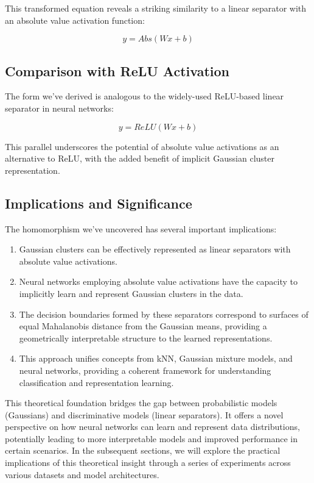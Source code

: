 \documentclass[11pt]{article}
\begin{document}
This transformed equation reveals a striking similarity to a linear separator with an absolute value activation function:

\begin{equation}
y = Abs(Wx + b)
\end{equation}

\subsection{Comparison with ReLU Activation}

The form we've derived is analogous to the widely-used ReLU-based linear separator in neural networks:

\begin{equation}
y = ReLU(Wx + b)
\end{equation}

This parallel underscores the potential of absolute value activations as an alternative to ReLU, with the added benefit of implicit Gaussian cluster representation.

\subsection{Implications and Significance}

The homomorphism we've uncovered has several important implications:

\begin{enumerate}
\item Gaussian clusters can be effectively represented as linear separators with absolute value activations.
\item Neural networks employing absolute value activations have the capacity to implicitly learn and represent Gaussian clusters in the data.
\item The decision boundaries formed by these separators correspond to surfaces of equal Mahalanobis distance from the Gaussian means, providing a geometrically interpretable structure to the learned representations.
\item This approach unifies concepts from kNN, Gaussian mixture models, and neural networks, providing a coherent framework for understanding classification and representation learning.
\end{enumerate}

This theoretical foundation bridges the gap between probabilistic models (Gaussians) and discriminative models (linear separators). It offers a novel perspective on how neural networks can learn and represent data distributions, potentially leading to more interpretable models and improved performance in certain scenarios.
In the subsequent sections, we will explore the practical implications of this theoretical insight through a series of experiments across various datasets and model architectures.
\end{document}
